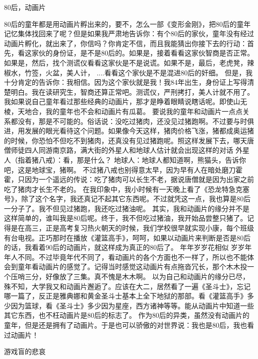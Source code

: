 80后，动画片

  80后的童年都是用动画片孵出来的，要不，怎么一部《变形金刚》，把80后的童年记忆集体找回来了呢？但是如果我严肃地告诉你：有个80后的家伙，童年没有经过动画片孵化，就出来了，你信吗？你肯定不信，而且我能猜出你接下去的行动：首先，看这家伙的身份证，是不是80后的。如果是，接着看看这家伙智商是否正常。如果是，然后，找个测谎仪看看这家伙是不是说谎。如果不是，最后，老虎凳，辣椒水，竹签，火盆，美人计， ....看看这个家伙是不是混进80后的奸细。
  但是，我十分肯定的告诉你：我相信。因为这个家伙就是我！我84年出生，身份证上写得清楚明白。我在读研究生，智商还算正常吧。测谎仪，严刑拷打，美人计就不用了。我如果说自己童年看过那些经典的动画片，那才是睁着眼睛说瞎话呢。即使山无棱，天地合，我的童年也不会和动画片有瓜葛。
  要说我的童年和动画片一点点关系都没有，那是不可能的。俗话说：没吃过猪肉，还没见过猪跑啊。不过要与时俱进，用发展的眼光看待这个问题。如果像今天这样，猪肉价格飞涨，猪都成奥运猪的时候，你恐怕不但吃不到猪肉，还真没有见过猪跑呢。照这样发展下去，哪天唐僧师徒四人同游南京路，满大街的外星人和地球人估计就会出现这样的对话
  外星人（指着猪八戒）：看，那是什么？
  地球人：地球人都知道啊，熊猫头，告诉你吧，这是地球宝，猪啊。
  不过猪八戒也别得意太早，因为早有人在暗处磨刀霍霍，只因为一个遥远的传说：吃了猪肉可以长生不老，据说唐僧就是因为出家之前吃了猪肉才长生不老的。
  在我印象中，我小时候有一天晚上看了《恐龙特急克塞号》，除了这个名字，我还真记不起其它东西呢。不过就凭这一点，我也算是80后一分子了。我不但见过猪跑，我还吃过猪油呢。
  其实，我和动画片的缘分并不是这样简单的，谁叫我是80后呢。终于，我不但吃过猪油，我开始品尝整只猪了。记得是在高三，正是高考复习热火朝天的时候，我们学校很早就实现小康，每个班级有台电视。正巧那时在播放《灌篮高手》，呵呵，如果以动画片来判断是否是80后的话，我看着90后的动画片，就这样成为真正的80后了。
  年年岁岁花相似 岁岁年年人不同。不过毕竟年代不同了，看动画片的各个方面也不一样了，所以也不能体会到童年看动画片的感觉了。记得当时感觉这动画片有点拖沓冗长，那个木木投一个压哨三分，好像放了三集。真不愧是木木啊。
  以为自己和动画片的缘分已尽，殊不知，大学我又和动画片邂逅了。应该在大二，居然看了一遍《圣斗士》，忘记哪一篇了，反正是雅典娜和黄金圣斗士基本上全下地狱的那部。看《灌篮高手》多少因为篮球，看《圣斗士》多少因为星座，西方诸神等等。能从动画片中知道一些其它东西，也不枉动画片是80后的标志了。
  作为80后的异类，虽然没有动画片的童年，但是还是拥有了动画片。于是也可以骄傲的对世界说：我也是80后，我也看过动画片！



游戏盲的悲哀

